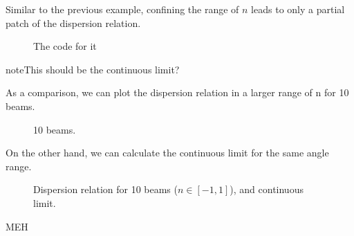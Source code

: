 \documentclass[letterpaper,12pt,english]{sphinxmanual}
\begin{document}
Similar to the previous example, confining the range of \(n\) leads to only a partial patch of the dispersion relation.
\begin{figure}[htbp]
\centering
\capstart

\noindent{}
\caption{The code for it}{\small 
\begin{sphinxVerbatim}[commandchars=\\\{\}]
\PYG{p}{[}\PYG{p}{]}  \PYG{p}{[}
\PYG{p}{[}\PYG{p}{[}   \PYG{p}{]}
\PYG{p}{[}   \PYG{p}{]}\PYG{p}{]}
\PYG{p}{[}          \PYG{p}{]}  
    \PYG{p}{]}
\end{sphinxVerbatim}
}\label{\detokenize{collective/dispersion-relation:id5}}\end{figure}

\begin{sphinxadmonition}{note}{This should be the continuous limit?}

As a comparison, we can plot the dispersion relation in a larger range of n for 10 beams.
\begin{figure}[htbp]
\centering
\capstart

\noindent{}
\caption{10 beams.}\label{\detokenize{collective/dispersion-relation:id6}}\end{figure}

On the other hand, we can calculate the continuous limit for the same angle range.
\begin{figure}[htbp]
\centering
\capstart

\noindent{}
\caption{Dispersion relation for 10 beams (\(n\in [-1,1]\)), and continuous limit.}\label{\detokenize{collective/dispersion-relation:id7}}\end{figure}

MEH
\end{sphinxadmonition}
\end{document}
